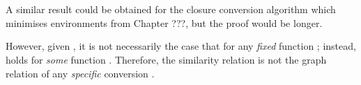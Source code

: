 \begin{code}
\AgdaSymbol{)}\AgdaSpace{}%
\AgdaSymbol{(}\AgdaSpace{}%
\AgdaSymbol{)}\<%
\\
%
\>[4]\AgdaSpace{}%
\AgdaSpace{}%
\AgdaSpace{}%
\AgdaSpace{}%
\AgdaSpace{}%
\AgdaSpace{}%
\AgdaSpace{}%
\AgdaSymbol{(}\AgdaSpace{}%
\AgdaSymbol{))}\AgdaSpace{}%
\AgdaSymbol{(}\AgdaSpace{}%
\AgdaSymbol{(}\AgdaSpace{}%
\AgdaSymbol{))}\AgdaSpace{}%
\<%
\\
\>[4][@{}l@{\AgdaIndent{0}}]%
\>[6]\AgdaSpace{}%
\AgdaSpace{}%
\AgdaSymbol{(}\AgdaSpace{}%
\AgdaSymbol{)}\<%
\\
%
\>[4]\AgdaSpace{}%
\AgdaSpace{}%
\AgdaSymbol{(}\AgdaSpace{}%
\AgdaSymbol{)}\AgdaSpace{}%
\<%
\\
\>[4][@{}l@{\AgdaIndent{0}}]%
\>[6]\AgdaSpace{}%
\<%
\\
%
\>[4]\<%
\\
%
\>[2]\AgdaSpace{}%
\AgdaSymbol{:}\AgdaSpace{}%
\AgdaSpace{}%
\AgdaOperator{\AgdaDatatype{\textasciitilde{}}}\AgdaSpace{}%
\AgdaSpace{}%
\AgdaSymbol{(}\AgdaSpace{}%
\AgdaSymbol{)}\AgdaSpace{}%
\AgdaSymbol{(}\AgdaSpace{}%
\AgdaSymbol{)}\<%
\\
%
\>[2]\AgdaSpace{}%
\AgdaSpace{}%
\AgdaSpace{}%
\AgdaSymbol{=}\AgdaSpace{}%
\AgdaSpace{}%
\<%
\end{code}

A similar result could be obtained for the closure conversion
algorithm which minimises environments from Chapter ???, but the proof
would be longer.

However, given , it is not
necessarily the case that  for any \textit{fixed}
function ; instead,  holds for \textit{some}
function . Therefore, the similarity relation is not the graph
relation of any \textit{specific} conversion .

